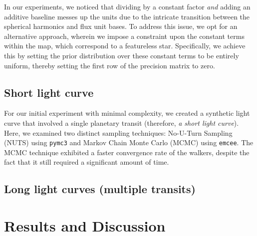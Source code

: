\documentclass[twocolumn]{aastex631}
\begin{document}
In our experiments, we noticed that dividing by a constant factor \emph{and} adding an additive baseline messes up the units due to the 
intricate transition between the spherical harmonics and flux unit bases. To address this issue, we opt for an alternative approach, wherein we 
impose a constraint upon the constant terms within the map, which correspond to a featureless star. Specifically, we achieve this by setting the prior distribution 
over these constant terms to be entirely uniform, thereby setting the first row of the precision matrix to zero.



\subsection{Short light curve}
For our initial experiment with minimal complexity, we created a synthetic light curve that involved a single planetary transit (therefore, 
\emph{a short light curve}). Here, we examined two distinct sampling techniques: No-U-Turn Sampling (NUTS) using \texttt{pymc3} and Markov Chain Monte Carlo (MCMC) 
using \texttt{emcee}. The MCMC technique exhibited a faster convergence rate of the walkers, despite the fact that it still required a significant amount of time.
\subsection{Long light curves (multiple transits)}
\section{Results and Discussion}


\end{document}
